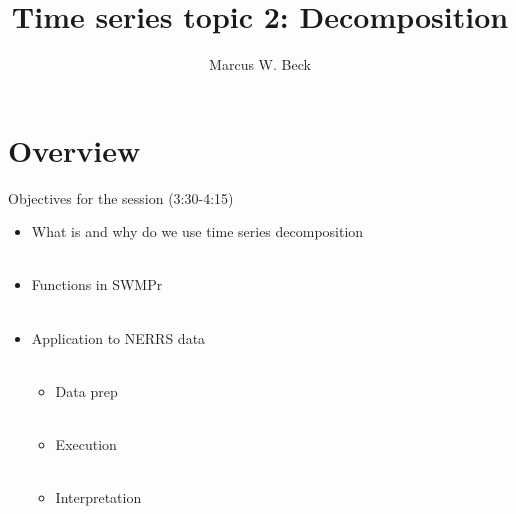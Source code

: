 \documentclass[xcolor=dvipsnames,serif]{beamer}\usepackage[]{graphicx}\usepackage[]{color}
\begin{document}
\title[TS decomposition]{Time series topic 2: Decomposition}

\author[M. Beck]{Marcus W. Beck}

\date{}









\section{Overview}

\begin{frame}{Objectives for the session (3:30-4:15)}
\begin{itemize}
\item What is and why do we use time series decomposition \\~\\
\item Functions in SWMPr \\~\\
\item Application to NERRS data \\~\\
\begin{itemize}
\item Data prep \\~\\
\item Execution \\~\\
\item Interpretation 
\end{itemize}
\end{itemize}
\end{frame}
\end{document}
